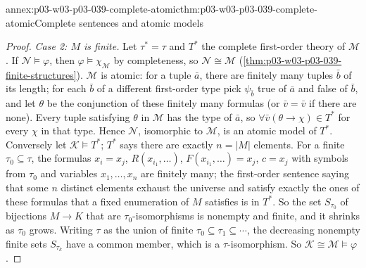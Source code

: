 \begin{annexitem}{annex:p03-w03-p03-039-complete-atomic}{thm:p03-w03-p03-039-complete-atomic}{Complete sentences and atomic models}
\begin{proof}
\emph{Case 2: \(M\) is finite.} Let \(\tau^*=\tau\) and \(T^*\) the complete
first-order theory of \(\mathcal M\). If \(\mathcal N\models\varphi\), then
\(\varphi\models\chi_{\mathcal M}\) by completeness, so
\(\mathcal N\cong\mathcal M\) (\cref{thm:p03-w03-p03-039-finite-structures}).
\(\mathcal M\) is atomic: for a tuple \(\bar a\), there are finitely many
tuples \(\bar b\) of its length; for each \(\bar b\) of a different
first-order type pick \(\psi_{\bar b}\) true of \(\bar a\) and false of
\(\bar b\), and let \(\theta\) be the conjunction of these finitely many
formulas (or \(\bar v=\bar v\) if there are none). Every tuple satisfying
\(\theta\) in \(\mathcal M\) has the type of \(\bar a\), so
\(\forall\bar v(\theta\to\chi)\in T^*\) for every \(\chi\) in that type.
Hence \(\mathcal N\), isomorphic to \(\mathcal M\), is an atomic model of
\(T^*\). Conversely let \(\mathcal K\models T^*\); \(T^*\) says there are
exactly \(n=\lvert M\rvert\) elements. For a finite
\(\tau_0\subseteq\tau\), the formulas \(x_i=x_j\), \(R(x_{i_1},\ldots)\),
\(F(x_{i_1},\ldots)=x_j\), \(c=x_j\) with symbols from \(\tau_0\) and
variables \(x_1,\ldots,x_n\) are finitely many; the first-order sentence
saying that some \(n\) distinct elements exhaust the universe and satisfy
exactly the ones of these formulas that a fixed enumeration of \(M\)
satisfies is in \(T^*\). So the set \(S_{\tau_0}\) of bijections \(M\to K\)
that are \(\tau_0\)-isomorphisms is nonempty and finite, and it shrinks as
\(\tau_0\) grows. Writing \(\tau\) as the union of finite
\(\tau_0\subseteq\tau_1\subseteq\cdots\), the decreasing nonempty finite sets
\(S_{\tau_k}\) have a common member, which is a \(\tau\)-isomorphism. So
\(\mathcal K\cong\mathcal M\models\varphi\).
\end{proof}
\end{annexitem}

